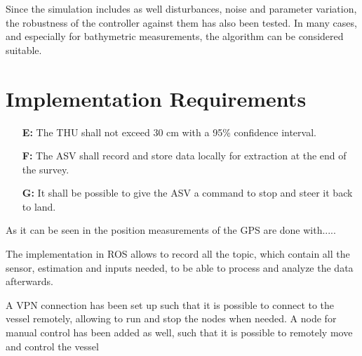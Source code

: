 Since the simulation includes as well disturbances, noise and parameter variation, the robustness of the controller against them has also been tested. In many cases, and especially for bathymetric measurements, the algorithm can be considered suitable.


\section{Implementation Requirements}
\begin{itemize}
  \item[\textbf{E:}] The THU shall not exceed 30 cm with a 95\% confidence interval.
  \item[\textbf{F:}] The ASV shall record and store data locally for extraction at the end of the survey.
  \item[\textbf{G:}] It shall be possible to give the ASV a command to stop and steer it back to land.
\end{itemize}

As it can be seen in  the position measurements of the GPS are done with.....

The implementation in ROS allows to record all the topic, which contain all the sensor, estimation and inputs needed, to be able to process and analyze the data afterwards.

A VPN connection has been set up such that it is possible to connect to the vessel remotely, allowing to run and stop the nodes when needed. A node for manual control has been added as well, such that it is possible to remotely move and control the vessel

